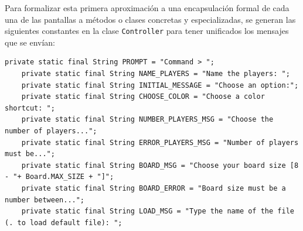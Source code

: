 \documentclass[12pt,a4paper,openright]{book}
\theoremstyle{break}
\begin{document}
Para formalizar esta primera aproximación a una encapsulación formal de cada una de las pantallas a métodos o clases concretas y especializadas, se generan las siguientes constantes en la clase \texttt{Controller} para tener unificados los mensajes que se envían:
\begin{lstlisting}
private static final String PROMPT = "Command > ";
	private static final String NAME_PLAYERS = "Name the players: ";
	private static final String INITIAL_MESSAGE = "Choose an option:";
	private static final String CHOOSE_COLOR = "Choose a color shortcut: ";
	private static final String NUMBER_PLAYERS_MSG = "Choose the number of players...";
	private static final String ERROR_PLAYERS_MSG = "Number of players must be...";
	private static final String BOARD_MSG = "Choose your board size [8 - "+ Board.MAX_SIZE + "]";
	private static final String BOARD_ERROR = "Board size must be a number between...";
	private static final String LOAD_MSG = "Type the name of the file (. to load default file): ";
\end{lstlisting}
\end{document}
